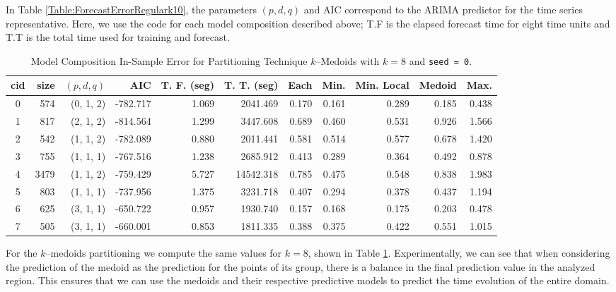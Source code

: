 In Table \ref{Table:ForecastErrorRegulark10}, the parameters $(p, d, q)$ and  AIC correspond to the ARIMA predictor for the time series representative. Here, we use the code for each model composition described above; T.F is the elapsed forecast time for eight time units and T.T is the total time used for training and forecast. 

\begin{table}[h]
	\centering
	\tiny
	\begin{tabular}{|c|r|r|r|r|r|r|r|r|r|r|}
		\hline
		cid & size & $(p, d, q)$ & AIC & T. F. (seg) & T. T. (seg) & Each & Min. & Min. Local & Medoid & Max. \\
		\hline
		0 &  574 & (0, 1, 2) & -782.717 & 1.069	&  2041.469	& 0.170	& 0.161	& 0.289	& 0.185	& 0.438	 \\
		1 &  817 & (2, 1, 2) & -814.564 & 1.299	&  3447.608	& 0.689	& 0.460	& 0.531	& 0.926	& 1.566	 \\
		2 &  542 & (1, 1, 2) & -782.089 & 0.880	&  2011.441	& 0.581	& 0.514	& 0.577	& 0.678	& 1.420	 \\
		3 &  755 & (1, 1, 1) & -767.516 & 1.238	&  2685.912	& 0.413	& 0.289	& 0.364	& 0.492	& 0.878	 \\
		4 & 3479 & (1, 1, 2) & -759.429 & 5.727	& 14542.318	& 0.785	& 0.475	& 0.548	& 0.838	& 1.983	 \\
		5 &  803 & (1, 1, 1) & -737.956 & 1.375	&  3231.718	& 0.407	& 0.294	& 0.378	& 0.437	& 1.194	 \\
		6 &  625 & (3, 1, 1) & -650.722 & 0.957	&  1930.740	& 0.157	& 0.168	& 0.175	& 0.203	& 0.478	 \\
		7 &  505 & (3, 1, 1) & -660.001 & 0.853	&  1811.335	& 0.388	& 0.375	& 0.422	& 0.551	& 1.015	 \\ \hline	
	\end{tabular}
	\caption{Model Composition In-Sample Error for Partitioning Technique  $k$--Medoids with $k=8$ and \texttt{seed = 0}.}
	\label{Table:ForecastErrorkMedoidsk8}
\end{table}

For the $k$--medoids partitioning we compute the same values for $k=8$, shown in Table \ref{Table:ForecastErrorkMedoidsk8}. Experimentally, we can see that when considering the prediction of the medoid as the prediction for the points of its group, there is a balance in the final prediction value in the analyzed region. This ensures that we can use the medoids and their respective predictive models to predict the time evolution of the entire domain.

